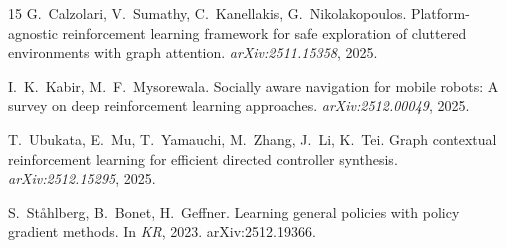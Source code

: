 \documentclass{article}
\begin{document}
\begin{thebibliography}{15}
G.~Calzolari, V.~Sumathy, C.~Kanellakis, G.~Nikolakopoulos.
Platform-agnostic reinforcement learning framework for safe exploration of cluttered environments with graph attention.
\textit{arXiv:2511.15358}, 2025.

I.~K.~Kabir, M.~F.~Mysorewala.
Socially aware navigation for mobile robots: A survey on deep reinforcement learning approaches.
\textit{arXiv:2512.00049}, 2025.

T.~Ubukata, E.~Mu, T.~Yamauchi, M.~Zhang, J.~Li, K.~Tei.
Graph contextual reinforcement learning for efficient directed controller synthesis.
\textit{arXiv:2512.15295}, 2025.

S.~St\r{a}hlberg, B.~Bonet, H.~Geffner.
Learning general policies with policy gradient methods.
In \textit{KR}, 2023. arXiv:2512.19366.

\end{thebibliography}
\end{document}
